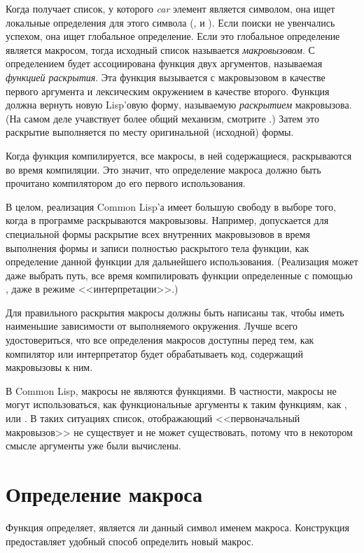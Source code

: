Когда  получает список, у которого \emph{car} элемент является
символом, она ищет локальные определения для этого символа (,
 и ). Если поиски не увенчались успехом, она ищет
глобальное определение. Если это глобальное определение является макросом, тогда
исходный список называется \emph{макровызовом}. С определением будет
ассоциирована функция двух аргументов, называемая \emph{функцией раскрытия}. 
Эта функция вызывается с макровызовом в качестве первого аргумента и лексическим
окружением в качестве второго. Функция должна вернуть новую Lisp'овую форму,
называемую \emph{раскрытием} макровызова. (На самом деле учавствует более общий
механизм, смотрите .)
Затем это раскрытие выполняется по месту оригинальной (исходной) формы.

Когда функция компилируется, все макросы, в ней содержащиеся, раскрываются во
время компиляции. Это значит, что определение макроса должно быть прочитано
компилятором до его первого использования.

В целом, реализация Common Lisp'а имеет большую свободу в выборе того, когда в
программе раскрываются макровызовы.
Например, допускается для специальной формы  раскрытие всех
внутренних макровызовов в время выполнения формы  и записи полностью
раскрытого тела функции, как определение данной функции для дальнейшего
использования.
(Реализация может даже выбрать путь, все время компилировать функции
определенные с помощью , даже в режиме <<интерпретации>>.)

Для правильного раскрытия макросы должны быть написаны так, чтобы иметь
наименьшие зависимости от выполняемого окружения. Лучше всего удостовериться,
что все определения макросов доступны перед тем, как компилятор или
интерпретатор будет обрабатываеть код, содержащий макровызовы к ним. 

В Common Lisp, макросы не являются функциями.
В частности, макросы не могут использоваться, как функциональные аргументы к
таким функциям, как ,  или . В таких ситуациях
список, отображающий <<первоначальный макровызов>> не существует и не может
существовать, потому что в некотором смысле аргументы уже были вычислены.

\section{Определение макроса}

Функция  определяет, является ли данный символ именем
макроса. Конструкция  предоставляет удобный способ определить
новый макрос.

